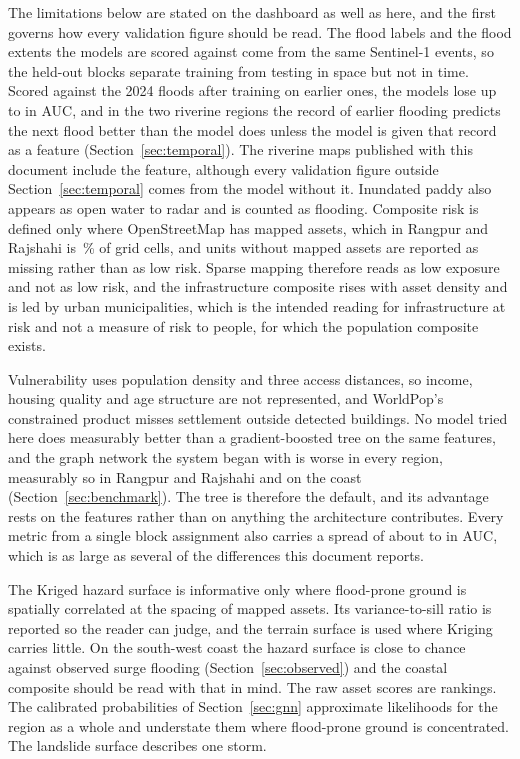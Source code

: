 \documentclass[10pt,a4paper,twocolumn]{article}
\begin{document}
The limitations below are stated on the dashboard as well as here, and the first governs how every validation figure should be read. The flood labels and the flood extents the models are scored against come from the same Sentinel-1 events, so the held-out blocks separate training from testing in space but not in time. Scored against the 2024 floods after training on earlier ones, the models lose up to \CoastalTempAllGap{} in AUC, and in the two riverine regions the record of earlier flooding predicts the next flood better than the model does unless the model is given that record as a feature (Section~\ref{sec:temporal}). The riverine maps published with this document include the feature, although every validation figure outside Section~\ref{sec:temporal} comes from the model without it. Inundated paddy also appears as open water to radar and is counted as flooding. Composite risk is defined only where OpenStreetMap has mapped assets, which in Rangpur and Rajshahi is \RRMappedCellShare{}\,\% of grid cells, and units without mapped assets are reported as missing rather than as low risk. Sparse mapping therefore reads as low exposure and not as low risk, and the infrastructure composite rises with asset density and is led by urban municipalities, which is the intended reading for infrastructure at risk and not a measure of risk to people, for which the population composite exists.

Vulnerability uses population density and three access distances, so income, housing quality and age structure are not represented, and WorldPop's constrained product misses settlement outside detected buildings. No model tried here does measurably better than a gradient-boosted tree on the same features, and the graph network the system began with is worse in every region, measurably so in Rangpur and Rajshahi and on the coast (Section~\ref{sec:benchmark}). The tree is therefore the default, and its advantage rests on the features rather than on anything the architecture contributes. Every metric from a single block assignment also carries a spread of about \SylhetBenchBoostingSD{} to \CoastalBenchBoostingSD{} in AUC, which is as large as several of the differences this document reports.

The Kriged hazard surface is informative only where flood-prone ground is spatially correlated at the spacing of mapped assets. Its variance-to-sill ratio is reported so the reader can judge, and the terrain surface is used where Kriging carries little. On the south-west coast the hazard surface is close to chance against observed surge flooding (Section~\ref{sec:observed}) and the coastal composite should be read with that in mind. The raw asset scores are rankings. The calibrated probabilities of Section~\ref{sec:gnn} approximate likelihoods for the region as a whole and understate them where flood-prone ground is concentrated. The landslide surface describes one storm.
\end{document}
